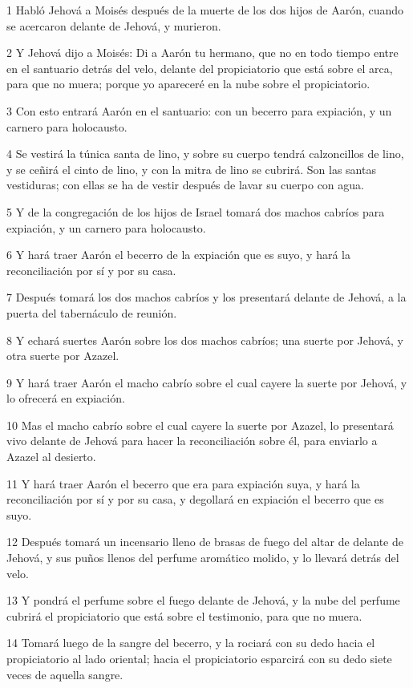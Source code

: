 \par 1 Habló Jehová a Moisés después de la muerte de los dos hijos de Aarón, cuando se acercaron delante de Jehová, y murieron.
\par 2 Y Jehová dijo a Moisés: Di a Aarón tu hermano, que no en todo tiempo entre en el santuario detrás del velo, delante del propiciatorio que está sobre el arca, para que no muera; porque yo apareceré en la nube sobre el propiciatorio.
\par 3 Con esto entrará Aarón en el santuario: con un becerro para expiación, y un carnero para holocausto.
\par 4 Se vestirá la túnica santa de lino, y sobre su cuerpo tendrá calzoncillos de lino, y se ceñirá el cinto de lino, y con la mitra de lino se cubrirá. Son las santas vestiduras; con ellas se ha de vestir después de lavar su cuerpo con agua.
\par 5 Y de la congregación de los hijos de Israel tomará dos machos cabríos para expiación, y un carnero para holocausto.
\par 6 Y hará traer Aarón el becerro de la expiación que es suyo, y hará la reconciliación por sí y por su casa.
\par 7 Después tomará los dos machos cabríos y los presentará delante de Jehová, a la puerta del tabernáculo de reunión.
\par 8 Y echará suertes Aarón sobre los dos machos cabríos; una suerte por Jehová, y otra suerte por Azazel.
\par 9 Y hará traer Aarón el macho cabrío sobre el cual cayere la suerte por Jehová, y lo ofrecerá en expiación.
\par 10 Mas el macho cabrío sobre el cual cayere la suerte por Azazel, lo presentará vivo delante de Jehová para hacer la reconciliación sobre él, para enviarlo a Azazel al desierto.
\par 11 Y hará traer Aarón el becerro que era para expiación suya, y hará la reconciliación por sí y por su casa, y degollará en expiación el becerro que es suyo.
\par 12 Después tomará un incensario lleno de brasas de fuego del altar de delante de Jehová, y sus puños llenos del perfume aromático molido, y lo llevará detrás del velo.
\par 13 Y pondrá el perfume sobre el fuego delante de Jehová, y la nube del perfume cubrirá el propiciatorio que está sobre el testimonio, para que no muera.
\par 14 Tomará luego de la sangre del becerro, y la rociará con su dedo hacia el propiciatorio al lado oriental; hacia el propiciatorio esparcirá con su dedo siete veces de aquella sangre.
